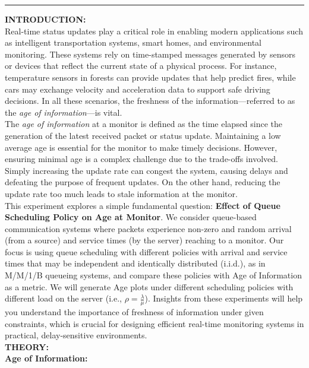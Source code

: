 \documentclass[a4paper,12pt]{article}
\begin{document}
\noindent
\rule{\textwidth}{2pt}
\noindent
\textbf{INTRODUCTION: }\\
\noindent
Real-time status updates play a critical role in enabling modern applications such as intelligent transportation systems, smart homes, and environmental monitoring. These systems rely on time-stamped messages generated by sensors or devices that reflect the current state of a physical process. For instance, temperature sensors in forests can provide updates that help predict fires, while cars may exchange velocity and acceleration data to support safe driving decisions. In all these scenarios, the freshness of the information---referred to as the \textit{age of information}---is vital.\\

\noindent
The \textit{age of information} at a monitor is defined as the time elapsed since the generation of the latest received packet or status update. Maintaining a low average age is essential for the monitor to make timely decisions. However, ensuring minimal age is a complex challenge due to the trade-offs involved. Simply increasing the update rate can congest the system, causing delays and defeating the purpose of frequent updates. On the other hand, reducing the update rate too much leads to stale information at the monitor.\\

\noindent
This experiment explores a simple fundamental question: \textbf{Effect of Queue Scheduling Policy on Age at Monitor}. We consider queue-based communication systems where packets experience non-zero and random arrival (from a source) and service times (by the server) reaching to a monitor. Our focus is using queue scheduling with different policies with arrival and service times that may be independent and identically distributed (i.i.d.), as in M/M/1/B queueing systems, and compare these policies with Age of Information as a metric. We will generate Age plots under different scheduling policies with different load on the server (i.e., $\rho = \frac{\lambda}{\mu}$). Insights from these experiments will help you understand the importance of freshness of information under given constraints, which is crucial for designing efficient real-time monitoring systems in practical, delay-sensitive environments.\\

\noindent
\textbf{THEORY: }\\
\textbf{Age of Information: }\\
\end{document}

